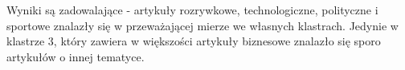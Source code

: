 Wyniki są zadowalające - artykuły rozrywkowe, technologiczne, polityczne i sportowe znalazły się w przeważającej mierze we własnych klastrach. Jedynie w klastrze 3, który zawiera w większości artykuły biznesowe znalazło się sporo artykułów o innej tematyce.

